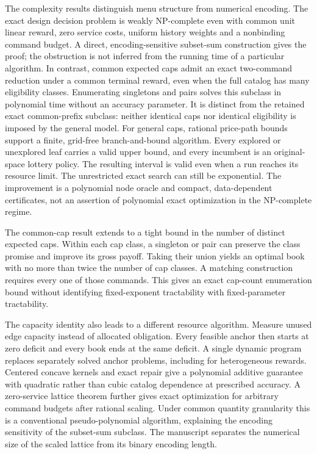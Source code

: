 The complexity results distinguish menu structure from numerical encoding. The exact design decision problem is weakly NP-complete even with common unit linear reward, zero service costs, uniform history weights and a nonbinding command budget. A direct, encoding-sensitive subset-sum construction gives the proof; the obstruction is not inferred from the running time of a particular algorithm. In contrast, common expected caps admit an exact two-command reduction under a common terminal reward, even when the full catalog has many eligibility classes. Enumerating singletons and pairs solves this subclass in polynomial time without an accuracy parameter. It is distinct from the retained exact common-prefix subclass: neither identical caps nor identical eligibility is imposed by the general model. For general caps, rational price-path bounds support a finite, grid-free branch-and-bound algorithm. Every explored or unexplored leaf carries a valid upper bound, and every incumbent is an original-space lottery policy. The resulting interval is valid even when a run reaches its resource limit. The unrestricted exact search can still be exponential. The improvement is a polynomial node oracle and compact, data-dependent certificates, not an assertion of polynomial exact optimization in the NP-complete regime.

The common-cap result extends to a tight bound in the number of distinct expected caps. Within each cap class, a singleton or pair can preserve the class promise and improve its gross payoff. Taking their union yields an optimal book with no more than twice the number of cap classes. A matching construction requires every one of those commands. This gives an exact cap-count enumeration bound without identifying fixed-exponent tractability with fixed-parameter tractability.

The capacity identity also leads to a different resource algorithm. Measure unused edge capacity instead of allocated obligation. Every feasible anchor then starts at zero deficit and every book ends at the same deficit. A single dynamic program replaces separately solved anchor problems, including for heterogeneous rewards. Centered concave kernels and exact repair give a polynomial additive guarantee with quadratic rather than cubic catalog dependence at prescribed accuracy. A zero-service lattice theorem further gives exact optimization for arbitrary command budgets after rational scaling. Under common quantity granularity this is a conventional pseudo-polynomial algorithm, explaining the encoding sensitivity of the subset-sum subclass. The manuscript separates the numerical size of the scaled lattice from its binary encoding length.

